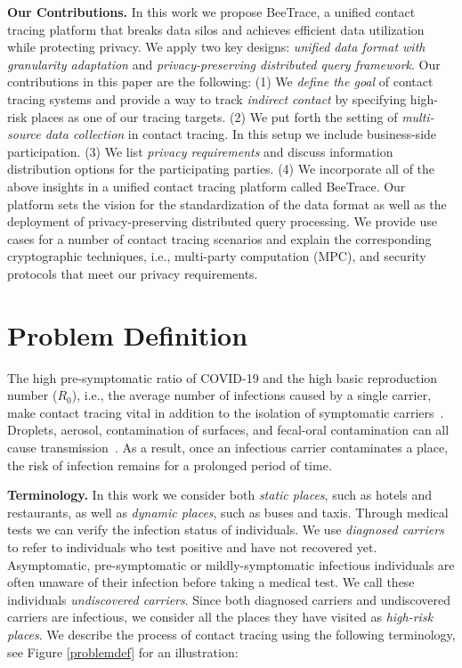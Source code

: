 \documentclass[11pt]{article}  %
\newcommand{\sysname}{\textsf{BeeTrace}\xspace}
\begin{document}
\textbf{Our Contributions.} In this work we propose \sysname, a unified contact tracing platform that breaks data silos and achieves efficient data utilization while protecting privacy. We apply two key designs: \emph{unified data format with granularity adaptation} and \emph{privacy-preserving distributed query framework}. %
Our contributions in this paper are the following: (1) We \emph{define the goal} of contact tracing systems and provide a way to track \emph{indirect contact} by specifying high-risk places as one of our tracing targets. (2) We put forth the setting of \emph{multi-source data collection} in contact tracing. In this setup we include business-side participation. (3) We list \emph{privacy requirements} and discuss information distribution options for the participating parties. (4) We incorporate all of the above insights in a unified contact tracing platform called \sysname. Our platform sets the vision for the standardization of the data format as well as the deployment of privacy-preserving distributed query processing. We provide use cases for a number of contact tracing scenarios and explain the corresponding cryptographic techniques, i.e., multi-party computation (MPC), and security protocols that meet our privacy requirements. 


\section{Problem Definition}


    The high pre-symptomatic ratio of COVID-19 and the high basic reproduction number ($R_0$), i.e., the average number of infections caused by a single carrier, make contact tracing vital in addition to the isolation of symptomatic carriers~\cite{Fraser2004}. Droplets, aerosol, contamination of surfaces, and fecal-oral contamination can all cause transmission~\cite{Ferretti2020}. As a result, once an infectious carrier contaminates a place, the risk of infection remains for a prolonged period of time.  


\textbf{Terminology.} In this work we consider both \emph{static places}, such as hotels and restaurants, as well as \emph{dynamic places}, such as buses and taxis. Through medical tests we can verify the infection status of individuals.
We use \emph{diagnosed carriers} to refer to individuals who test positive and have not recovered yet. 
Asymptomatic, pre-symptomatic or mildly-symptomatic infectious individuals are often unaware of their infection before taking a medical test. We call these individuals \emph{undiscovered carriers}. Since both diagnosed carriers and undiscovered carriers are infectious, we consider all the places they have visited as \emph{high-risk places}. %
We describe the process of contact tracing  using the following terminology, see
Figure \ref{problemdef} for an illustration:
\end{document}
